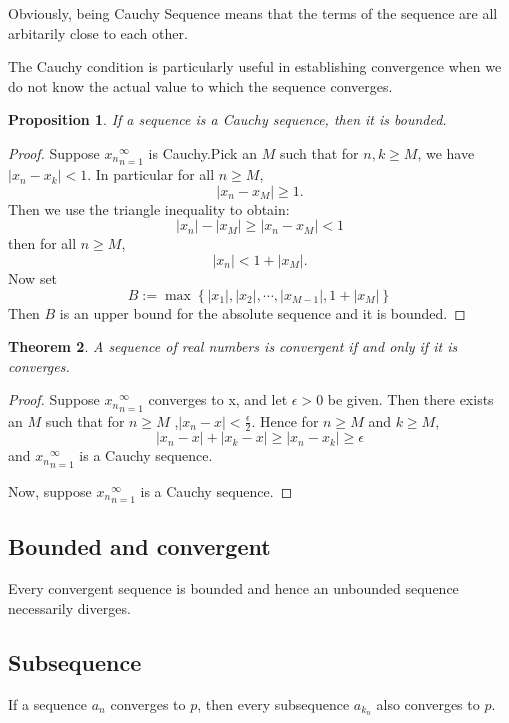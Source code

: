 \documentclass{article}
\newtheorem{theorem}{Theorem}[section]
\newtheorem{prop}[theorem]{Proposition}
\theoremstyle{definition}
\begin{document}
Obviously, being Cauchy Sequence means that the terms 
of the sequence are all arbitarily close to each other.

The Cauchy condition is particularly useful in establishing 
convergence when we do not know the actual value to which 
the sequence converges.

\begin{prop}
If a sequence is a Cauchy sequence, then it is bounded.
\end{prop}

\begin{proof}
    Suppose ${x_{n}}_{n=1}^{\infty}$ is Cauchy.Pick an $M$ 
    such that for $n,k\geq M$, we have $|x_{n}-x_{k}|<1$. In particular 
    for all $n\geq M$, $$|x_{n}-x_{M}|\geq 1.$$
    Then we use the triangle inequality to obtain:
    $$|x_{n}|-|x_{M}|\geq |x_{n}-x_{M}| <1$$
    then for all $n\geq M$, $$|x_{n}|<1+|x_{M}|.$$
    Now set 
    $$B:=\max\left\{|x_{1}|,|x_{2}|,\cdots,|x_{M-1}|,1+|x_{M}|\right\}$$
    Then $B$ is an upper bound for the absolute sequence and it is bounded.
\end{proof}

\begin{theorem}
    A sequence of real numbers is convergent if and only if it is converges.
\end{theorem}

\begin{proof}
Suppose ${x_{n}}_{n=1}^{\infty}$ converges to x, and let $\epsilon>0$ be given. Then there exists 
an $M$ such that for $n\geq M$ ,$|x_{n}-x|<\frac{\epsilon}{2}.$
Hence for $n\geq M$ and $k\geq M$, 
$$|x_{n}-x|+|x_{k}-x|\geq |x_{n}-x_{k}| \geq \epsilon$$
and ${x_{n}}_{n=1}^{\infty}$ is a Cauchy sequence.

Now, suppose ${x_{n}}_{n=1}^{\infty}$ is a Cauchy sequence.


\end{proof}






\subsection{Bounded and convergent}
Every convergent sequence is bounded and hence an unbounded sequence 
necessarily diverges.

\subsection{Subsequence}
If a sequence ${a_{n}}$ converges to $p$, then every subsequence ${a_{k_{n}}}$ 
also converges to $p$.
\end{document}
